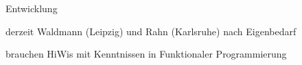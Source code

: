 \begin{slide}{Entwicklung}

derzeit Waldmann (Leipzig) und Rahn (Karlsruhe)
nach Eigenbedarf

brauchen HiWis mit Kenntnissen in Funktionaler Programmierung


\end{slide}
